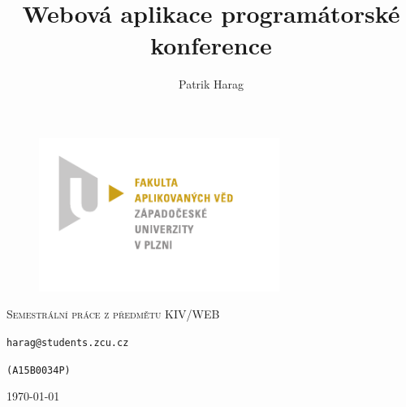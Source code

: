 \documentclass[12pt, a4paper]{article}
\title{Webová aplikace programátorské konference}
\author{Patrik Harag}
\makeatletter
\def \thesubtitle {Semestrální práce z předmětu KIV/WEB}
\def \theauthoremail {harag@students.zcu.cz}
\def \theauthorid {(A15B0034P)}
\makeatother
\begin{document}
\begin{titlepage}
	\begin{figure}
		\includegraphics[height=50mm]{img-fav-logo}
	\end{figure}
	
	\centering
	{\large \hspace{1mm} \par} %
	\vspace{15ex}
	
	{\scshape\Large \thesubtitle \par}
	\vspace{1.5ex}
	{\huge\bfseries \thetitle \par}
	\vspace{2ex}
	{\Large\itshape \theauthor \par}
	\vspace{2ex}
	{\texttt{\theauthoremail} \par}
	\vspace{1ex}
	{\texttt{\theauthorid} \par}
	
	\vfill
	
	{\large \today\par}
\end{titlepage}

\end{document}

